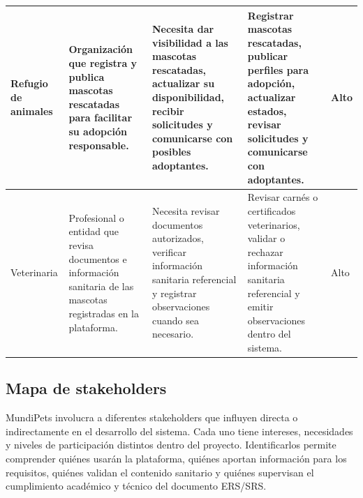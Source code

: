 \documentclass[journal,onecolumn]{IEEEtran}
\begin{document}
\begin{longtable}{|p{2.2cm}|p{3.4cm}|p{3.4cm}|p{3.7cm}|p{1.2cm}|}
		Refugio de animales & Organización que registra y publica mascotas rescatadas para facilitar su adopción responsable. & Necesita dar visibilidad a las mascotas rescatadas, actualizar su disponibilidad, recibir solicitudes y comunicarse con posibles adoptantes. & Registrar mascotas rescatadas, publicar perfiles para adopción, actualizar estados, revisar solicitudes y comunicarse con adoptantes. & Alto \\ \hline
		
		Veterinaria & Profesional o entidad que revisa documentos e información sanitaria de las mascotas registradas en la plataforma. & Necesita revisar documentos autorizados, verificar información sanitaria referencial y registrar observaciones cuando sea necesario. & Revisar carnés o certificados veterinarios, validar o rechazar información sanitaria referencial y emitir observaciones dentro del sistema. & Alto \\ \hline
	\end{longtable}
	
	\subsection{Mapa de stakeholders}
	\label{sec:stakeholders}
	
	MundiPets involucra a diferentes stakeholders que influyen directa o
	indirectamente en el desarrollo del sistema. Cada uno tiene intereses,
	necesidades y niveles de participación distintos dentro del proyecto.
	Identificarlos permite comprender quiénes usarán la plataforma, quiénes
	aportan información para los requisitos, quiénes validan el contenido
	sanitario y quiénes supervisan el cumplimiento académico y técnico del
	documento ERS/SRS.
	
\end{document}
